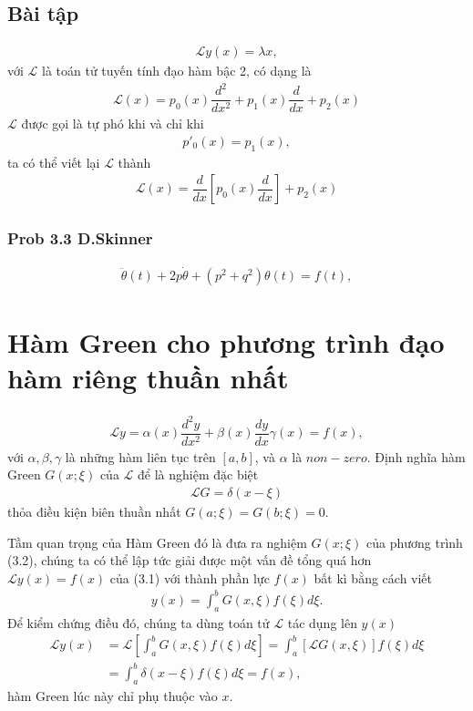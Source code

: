 \documentclass{report}
\newcommand{\f}[2]{\dfrac{#1}{#2}}
\begin{document}
\section{Bài tập}
\begin{align*}
	\mathcal{L} y(x) = \lambda x, 
\end{align*}
với $\mathcal{L}$ là toán tử tuyến tính đạo hàm bậc 2, có dạng là
\begin{align*}
	\mathcal{L} (x) = p_{0}(x)\f{d^2}{dx^2} + p_{1}(x)\f{d}{dx} + p_{2}(x)
\end{align*}
$\mathcal{L}$ được gọi là tự phó khi và chỉ khi
\begin{align*}
	p'_{0}(x) = p_{1}(x),
\end{align*}
ta có thể viết lại $\mathcal{L}$ thành
\begin{align*}
	\mathcal{L} (x) = \f{d}{dx}\left[p_{0}(x) \f{d}{dx}\right] + p_{2}(x)
\end{align*}
\subsection{Prob 3.3 D.Skinner}
\begin{align*}
	\ddot{\theta}(t) + 2p \dot{\theta} + (p^2 + q^2) \theta(t) = f(t),
\end{align*}






\chapter{Hàm Green cho phương trình đạo hàm riêng thuần nhất}
\begin{align}
	\mathcal{L} y = \alpha(x) \f{d^2 y}{dx^2} + \beta(x)\f{dy}{dx} \gamma(x) = f(x),
\end{align}
với $\alpha,\beta,\gamma$ là những hàm liên tục trên $\left[a,b\right]$, và $\alpha$ là $non-zero$. Định nghĩa hàm Green $G(x;\xi)$ của $\mathcal{L}$ để là nghiệm đặc biệt
\begin{align}
	\mathcal{L} G = \delta (x-\xi)
\end{align}
thỏa điều kiện biên thuần nhất $G(a;\xi) = G(b;\xi) = 0$.

Tầm quan trọng của Hàm Green đó là đưa ra nghiệm $G(x;\xi)$ của phương trình (3.2), chúng ta có thể lập tức giải được một vấn đề tổng quá hơn $\mathcal{L} y(x) = f(x)$ của (3.1) với thành phần lực $f(x)$ bất kì bằng cách viết
\begin{align}
	y(x) = \int_{a}^{b} G(x,\xi) f(\xi) d\xi.
\end{align}
Để kiểm chứng điều đó, chúng ta dùng toán tử $\mathcal{L}$ tác dụng lên $y(x)$
\begin{align}
	\mathcal{L} y(x)
	 & = \mathcal{L} \left[ \int_{a}^{b} G(x,\xi) f(\xi) d\xi \right] = \int_{a}^{b} \left[ \mathcal{L} G(x,\xi) \right] f(\xi) d\xi \nonumber \\
	 & = \int_{a}^{b} \delta(x - \xi) f(\xi) d\xi = f(x),
\end{align}
hàm Green lúc này chỉ phụ thuộc vào $x$.
\end{document}
